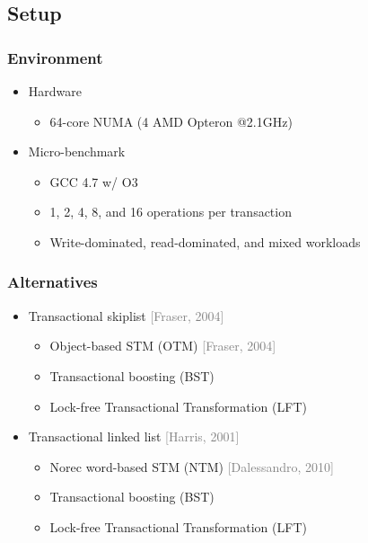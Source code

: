 \documentclass{beamer}
\begin{document}
\subsection{Setup}
\begin{frame} \frametitle{Environment}
    \begin{itemize}
        \item Hardware
            \begin{itemize}
                \item 64-core NUMA (4 AMD Opteron @2.1GHz)
            \end{itemize}
        \item Micro-benchmark
            \begin{itemize}
                \item GCC 4.7 w/ O3
                \item 1, 2, 4, 8, and 16 operations per transaction
                \item Write-dominated, read-dominated, and mixed workloads
            \end{itemize}
    \end{itemize}
\end{frame}

\begin{frame} \frametitle{Alternatives}
    \begin{itemize}
        \item Transactional skiplist \textcolor{gray}{[Fraser, 2004]}
            \begin{itemize}
                \item Object-based STM (OTM) \textcolor{gray}{[Fraser, 2004]}
                \item Transactional boosting (BST) 
                \item Lock-free Transactional Transformation (LFT)
            \end{itemize}
        \item Transactional linked list \textcolor{gray}{[Harris, 2001]}
            \begin{itemize}
                \item Norec word-based STM (NTM) \textcolor{gray}{[Dalessandro, 2010]}
                \item Transactional boosting (BST)
                \item Lock-free Transactional Transformation (LFT)
            \end{itemize}
    \end{itemize}
\end{frame}
\end{document}
